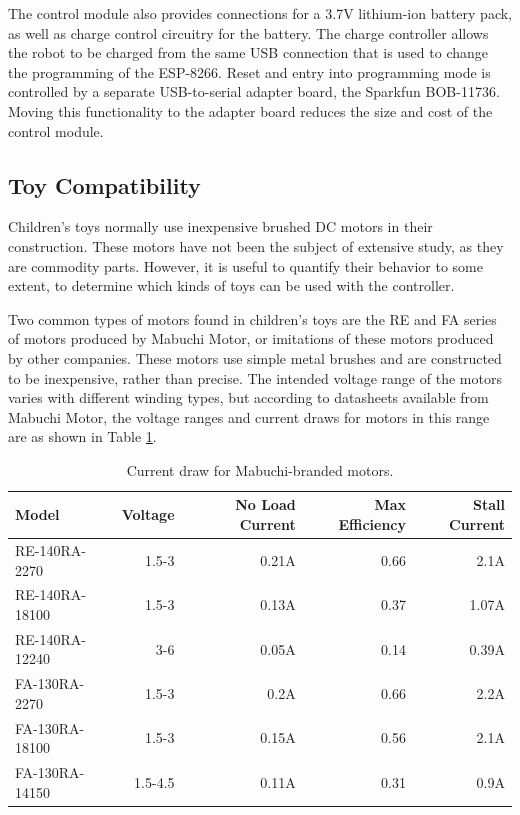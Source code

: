 The control module also provides connections for a 3.7V lithium-ion battery pack, as well as charge control circuitry for the battery. 
The charge controller allows the robot to be charged from the same USB connection that is used to change the programming of the ESP-8266. 
Reset and entry into programming mode is controlled by a separate USB-to-serial adapter board, the Sparkfun BOB-11736.
Moving this functionality to the adapter board reduces the size and cost of the control module. 

\subsection{Toy Compatibility} \label{section:Toy_Compatibility}

Children's toys normally use inexpensive brushed DC motors in their construction. 
These motors have not been the subject of extensive study, as they are commodity parts. 
However, it is useful to quantify their behavior to some extent, to determine which kinds of toys can be used with the controller. 

Two common types of motors found in children's toys are the RE and FA series of motors produced by Mabuchi Motor, or imitations of these motors produced by other companies. 
These motors use simple metal brushes and are constructed to be inexpensive, rather than precise. 
The intended voltage range of the motors varies with different winding types, but according to datasheets available from Mabuchi Motor, the voltage ranges and current draws for motors in this range are as shown in Table \ref{tab:properBrandedMotors}.

\begin{table}
	\begin{tabular}{l r r r r}
		Model & Voltage & No Load Current & Max Efficiency & Stall Current\\
		\hline
		RE-140RA-2270 & 1.5-3 & 0.21A & 0.66 & 2.1A\\
		RE-140RA-18100 & 1.5-3 & 0.13A & 0.37 & 1.07A\\
		RE-140RA-12240 & 3-6 & 0.05A & 0.14 & 0.39A\\
		FA-130RA-2270 & 1.5-3 & 0.2A & 0.66 & 2.2A\\
		FA-130RA-18100 & 1.5-3 & 0.15A & 0.56 & 2.1A\\
		FA-130RA-14150 & 1.5-4.5 & 0.11A & 0.31 & 0.9A\\
	\end{tabular}
	\caption{Current draw for Mabuchi-branded motors.}
	\label{tab:properBrandedMotors}
\end{table}

